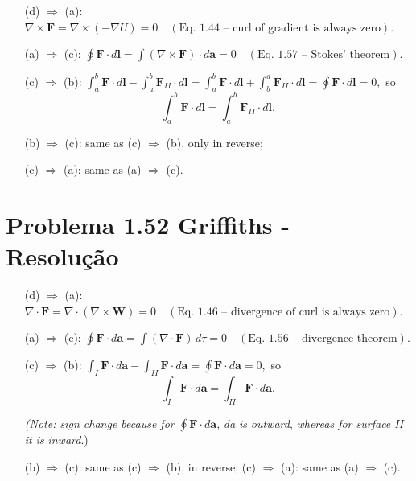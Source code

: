 \documentclass[a4paper,12pt]{article}
\begin{document}
\begin{itemize}
    \item[(d) $\Rightarrow$ (a):] $\nabla \times \mathbf{F} = \nabla \times (-\nabla U) = 0 \quad (\text{Eq. 1.44 – curl of gradient is always zero}).$
    \item[(a) $\Rightarrow$ (c):] $\oint \mathbf{F} \cdot d\mathbf{l} = \int (\nabla \times \mathbf{F}) \cdot d\mathbf{a} = 0 \quad (\text{Eq. 1.57 – Stokes’ theorem}).$
    \item[(c) $\Rightarrow$ (b):] $\int_a^b \mathbf{F} \cdot d\mathbf{l} - \int_a^b \mathbf{F}_{II} \cdot d\mathbf{l} = \int_a^b \mathbf{F} \cdot d\mathbf{l} + \int_b^a \mathbf{F}_{II} \cdot d\mathbf{l} = \oint \mathbf{F} \cdot d\mathbf{l} = 0,$ 
    so 
    \[
    \int_a^b \mathbf{F} \cdot d\mathbf{l} = \int_a^b \mathbf{F}_{II} \cdot d\mathbf{l}.
    \]
    \item[(b) $\Rightarrow$ (c):] same as (c) $\Rightarrow$ (b), only in reverse; 
    \item[(c) $\Rightarrow$ (a):] same as (a) $\Rightarrow$ (c).
\end{itemize}

\section*{Problema 1.52 Griffiths - Resolu\c{c}\~ao}

\begin{itemize}
    \item[(d) $\Rightarrow$ (a):] $\nabla \cdot \mathbf{F} = \nabla \cdot (\nabla \times \mathbf{W}) = 0 \quad (\text{Eq. 1.46 – divergence of curl is always zero}).$
    \item[(a) $\Rightarrow$ (c):] $\oint \mathbf{F} \cdot d\mathbf{a} = \int (\nabla \cdot \mathbf{F}) \, d\tau = 0 \quad (\text{Eq. 1.56 – divergence theorem}).$

    (c) $\Rightarrow$ (b): \(\int_I \mathbf{F} \cdot d\mathbf{a} - \int_{II} \mathbf{F} \cdot d\mathbf{a} = \oint \mathbf{F} \cdot d\mathbf{a} = 0,\) so  
\[
\int_I \mathbf{F} \cdot d\mathbf{a} = \int_{II} \mathbf{F} \cdot d\mathbf{a}.
\]

\textit{(Note: sign change because for} \(\oint \mathbf{F} \cdot d\mathbf{a}\), \textit{da is} \textit{outward}, \textit{whereas for surface II it is} \textit{inward}.)  

(b) $\Rightarrow$ (c): same as (c) $\Rightarrow$ (b), in reverse; (c) $\Rightarrow$ (a): same as (a) $\Rightarrow$ (c).

\end{itemize}
\end{document}
